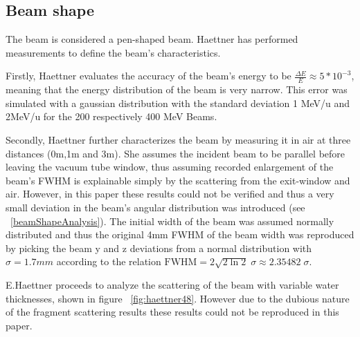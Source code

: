 \subsection{Beam shape}


The beam is considered a pen-shaped beam. Haettner has performed measurements to define the beam's characteristics.

Firstly, Haettner evaluates the accuracy of the beam's energy to be $\frac{\Delta E}{E}\approx5*10^{-3}$, meaning that the energy distribution of the beam is very narrow. This error was simulated with a gaussian distribution with the standard deviation 1 MeV/u and 2MeV/u for the 200 respectively 400 MeV Beams.

Secondly, Haettner further characterizes the beam by measuring it in air at three distances (0m,1m and 3m). She assumes the incident beam to be parallel before leaving the vacuum tube window, thus assuming recorded enlargement of the beam's FWHM is explainable simply by the scattering from the exit-window and air. However, in this paper these results could not be verified and thus a very small deviation in the beam's angular distribution was introduced (see ~\ref{beamShapeAnalysis}). The initial width of the beam was assumed normally distributed and thus the original 4mm FWHM of the beam width was reproduced by picking the beam y and z deviations from a normal distribution with $\sigma = 1.7mm$ according to the relation $\mathrm{FWHM} =   2 \sqrt{2 \ln 2 } \; \sigma \approx 2.35482 \; \sigma$.

E.Haettner proceeds to analyze the scattering of the beam with variable water thicknesses, shown in figure ~\ref{fig:haettner48}. However due to the dubious nature of the fragment scattering results these results could not be reproduced in this paper.


